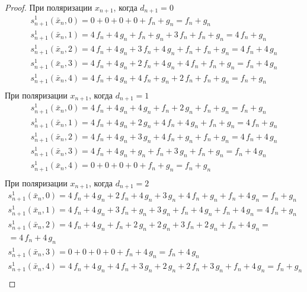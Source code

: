 \documentclass[bibliography=totoc, a4paper, 14pt]{extarticle}
\begin{document}
 \begin{proof}


При поляризации $x_{n+1}$, когда $d_{n+1} = 0$
$$\begin{array}{l}
s_{n+1}^1(\bar{x}_n, 0) = 0 + 0 + 0 + 0 + f_n + g_n = f_n + g_n \\
s_{n+1}^1(\bar{x}_n, 1) = 4\,f_n + 4\,g_n + f_n + g_n + 3\,f_n + f_n + g_n = 4\,f_n + g_n \\
s_{n+1}^1(\bar{x}_n, 2) = 4\,f_n + 4\,g_n + 3\,f_n + 4\,g_n + f_n + f_n + g_n = 4\,f_n + 4\,g_n \\
s_{n+1}^1(\bar{x}_n, 3) = 4\,f_n + 4\,g_n + 2\,f_n + 4\,g_n + 4\,f_n + f_n + g_n = f_n + 4\,g_n \\
s_{n+1}^1(\bar{x}_n, 4) = 4\,f_n + 4\,g_n + 4\,f_n + g_n + 2\,f_n + f_n + g_n = f_n + g_n \\
\end{array}$$
При поляризации $x_{n+1}$, когда $d_{n+1} = 1$
$$\begin{array}{l}
s_{n+1}^1(\bar{x}_n, 0) = 4\,f_n + 4\,g_n + 4\,g_n + f_n + 2\,g_n + f_n + g_n = f_n + g_n \\
s_{n+1}^1(\bar{x}_n, 1) = 4\,f_n + 4\,g_n + 2\,g_n + 4\,f_n + 4\,g_n + f_n + g_n = 4\,f_n + g_n \\
s_{n+1}^1(\bar{x}_n, 2) = 4\,f_n + 4\,g_n + 3\,g_n + 4\,f_n + g_n + f_n + g_n = 4\,f_n + 4\,g_n \\
s_{n+1}^1(\bar{x}_n, 3) = 4\,f_n + 4\,g_n + g_n + f_n + 3\,g_n + f_n + g_n = f_n + 4\,g_n \\
s_{n+1}^1(\bar{x}_n, 4) = 0 + 0 + 0 + 0 + f_n + g_n = f_n + g_n \\
\end{array}$$
При поляризации $x_{n+1}$, когда $d_{n+1} = 2$
$$\begin{array}{l}
s_{n+1}^1(\bar{x}_n, 0) = 4\,f_n + 4\,g_n + 2\,f_n + 4\,g_n + 3\,g_n + 4\,f_n + g_n + f_n + 4\,g_n = f_n + g_n \\
s_{n+1}^1(\bar{x}_n, 1) = 4\,f_n + 4\,g_n + 3\,f_n + g_n + 3\,g_n + f_n + 4\,g_n + f_n + 4\,g_n = 4\,f_n + g_n \\
s_{n+1}^1(\bar{x}_n, 2) = 4\,f_n + 4\,g_n + f_n + 2\,g_n + 2\,g_n + 3\,f_n + 2\,g_n + f_n + 4\,g_n = \\
= 4\,f_n + 4\,g_n \\
s_{n+1}^1(\bar{x}_n, 3) = 0 + 0 + 0 + 0 + f_n + 4\,g_n = f_n + 4\,g_n \\
s_{n+1}^1(\bar{x}_n, 4) = 4\,f_n + 4\,g_n + 4\,f_n + 3\,g_n + 2\,g_n + 2\,f_n + 3\,g_n + f_n + 4\,g_n = f_n + g_n \\

\end{array}$$
\end{proof}
\end{document}
